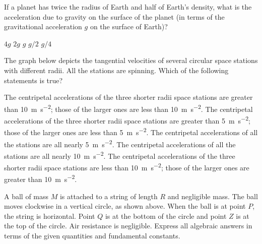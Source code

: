 \documentclass{../../../oss-ap12ibhl}
\begin{document}
\begin{questions}
  \question If a planet has twice the radius of Earth and half of Earth's
  density, what is the acceleration due to gravity on the surface of the planet
  (in terms of the gravitational acceleration $g$ on the surface of Earth)?
  \begin{choices}
    \choice $4g$
    \choice $2g$
    \choice $g$
    \choice $g/2$
    \choice $g/4$
  \end{choices}

  \question The graph below depicts the tangential velocities of several
  circular space stations with different radii. All the stations are spinning.
  Which of the following statements is true?
  \begin{choices}
    \choice The centripetal accelerations of the three shorter radii space
    stations are greater than \SI{10}{\metre\per\second\squared}; those of
    the larger ones are less than \SI{10}{\metre\per\second\squared}.
    \choice  The centripetal accelerations of the three shorter radii space
    stations are greater than \SI{5}{\metre\per\second\squared}; those of
      the larger ones are less than \SI{5}{\metre\per\second\squared}.
      \choice The centripetal accelerations of all the stations are all nearly
      \SI{5}{\metre\per\second\squared}.
      \choice The centripetal accelerations of all the stations are all nearly
      \SI{10}{\metre\per\second\squared}.
      \choice The centripetal accelerations of the three shorter radii space
      stations are less than \SI{10}{\metre\per\second\squared}; those of the
      larger ones are greater than \SI{10}{\metre\per\second\squared}.
  \end{choices}
  \newpage
  

  \question A ball of mass $M$ is attached to a string of length $R$ and
  negligible mass. The ball moves clockwise in a vertical circle, as shown
  above. When the ball is at point $P$, the string is horizontal. Point $Q$ is
  at the bottom of the circle and point $Z$ is at the top of the circle. Air
  resistance is negligible. Express all algebraic answers in terms of the given
  quantities and fundamental constants.
  \begin{parts}

\end{parts}
\end{questions}
\end{document}
